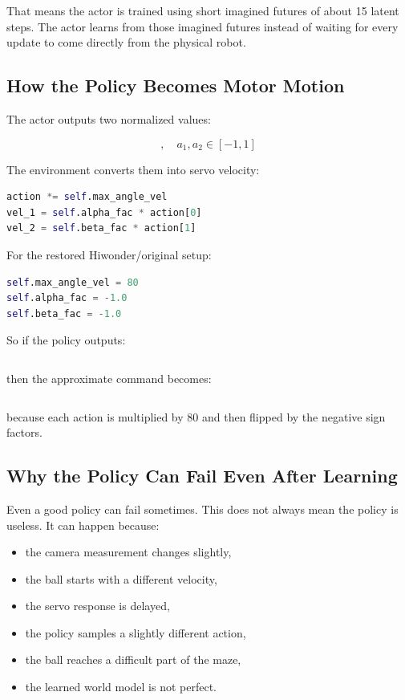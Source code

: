 \documentclass[11pt]{article}
\begin{document}
That means the actor is trained using short imagined futures of about 15 latent steps. The actor learns from those imagined futures instead of waiting for every update to come directly from the physical robot.

\subsection{How the Policy Becomes Motor Motion}

The actor outputs two normalized values:

\begin{equation}
[a_1, a_2], \quad a_1,a_2 \in [-1,1]
\end{equation}

The environment converts them into servo velocity:

\begin{lstlisting}[language=Python]
action *= self.max_angle_vel
vel_1 = self.alpha_fac * action[0]
vel_2 = self.beta_fac * action[1]
\end{lstlisting}

For the restored Hiwonder/original setup:

\begin{lstlisting}[language=Python]
self.max_angle_vel = 80
self.alpha_fac = -1.0
self.beta_fac = -1.0
\end{lstlisting}

So if the policy outputs:

\begin{equation}
[0.5, -1.0]
\end{equation}

then the approximate command becomes:

\begin{equation}
[-40, 80]
\end{equation}

because each action is multiplied by 80 and then flipped by the negative sign factors.

\subsection{Why the Policy Can Fail Even After Learning}

Even a good policy can fail sometimes. This does not always mean the policy is useless. It can happen because:

\begin{itemize}[leftmargin=*]
  \item the camera measurement changes slightly,
  \item the ball starts with a different velocity,
  \item the servo response is delayed,
  \item the policy samples a slightly different action,
  \item the ball reaches a difficult part of the maze,
  \item the learned world model is not perfect.
\end{itemize}
\end{document}
